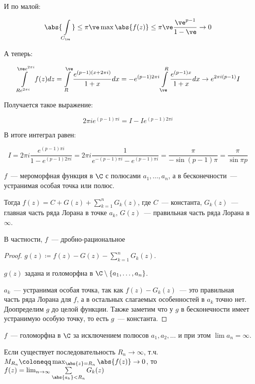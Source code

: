 \begin{example}
    И по малой:

    \[
        \abs{\int\limits_{C_\ve}} \le \pi \ve
        \max \abs{f(z)} \le \pi \ve \frac{\ve^{p-1}}{1-\ve} \to 0
    \]

    А теперь:

    \[
        \int\limits_{Re^{2\pi i}}^{\ve e^{2\pi i}} f(z)dz
        = \int\limits_R^\ve \frac{e^{(p-1)(x+2\pi i)}}{1+x}dx
        = -e^{(p-1)2\pi i}
        \int\limits_\ve^R \frac{e^{(p-1)x}}{1+x}dx
        \to e^{2\pi i(p-1)}I
    \]

    Получается такое выражение:

    \[
        2\pi i e^{(p-1)\pi i} = I - Ie^{(p-1)2\pi i}
    \]

    В итоге интеграл равен:

    \[
        I = 2\pi i \frac{e^{(p-1)\pi i}}{1-e^{(p-1)2\pi i}}
        = 2\pi i \frac{1}{e^{-(p-1)\pi i}-e^{(p-1)\pi i}}
        = \frac{\pi}{-\sin (p-1)\pi } = \frac{\pi}{\sin \pi p}
    \]

\end{example}

\begin{theorem}
    $f$~--- мероморфная функция в $\C$ с полюсами
    $a_1, \ldots, a_n$, а в бесконечности~--- устранимая
    особая точка или полюс.

    Тогда $f(z) = C + G(z) + \sum\limits_{k=1}^n G_k(z)$,
    где $C$~--- константа, $G_k(z)$~--- главная
    часть ряда Лорана в точке $a_k$, $G(z)$~--- правильная
    часть ряда Лорана в $\infty$.

    В частности, $f$~--- дробно-рациональное
\end{theorem}

\begin{proof}
    $g(z) \coloneqq f(z) - G(z) - \sum\limits_{k=1}^n G_k(z)$.

    $g(z)$ задана и голоморфна в
    $\C \setminus \left\{a_1, \ldots, a_n\right\}$.

    $a_k$~--- устранимая особая точка,
    так как $f(z) - G_k(z)$~--- это правильная часть ряда Лорана для
    $f$, а в остальных слагаемых особенностей в $a_k$ точно нет.
    Доопределим $g$ до целой функции.
    Также заметим что у $g$ в бесконечности
    имеет устранимую особую точку, то есть $g$~--- константа.
\end{proof}

\begin{theorem}
    $f$~--- голоморфна в $\C$ за исключением полюсов
    $a_1, a_2, \ldots$ и при этом $\lim a_n = \infty$.

    Если существует последовательность $R_n \to \infty$,
    т.ч. $M_{R_n} \coloneqq \max_{\abs{z} = R_n} \abs{f(z)} \to 0$,
    то $f(z) = \lim_{n\to\infty} \sum\limits_{\abs{a_k} < R_n} G_k(z)$
\end{theorem}

